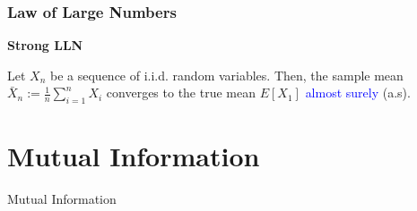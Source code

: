 \documentclass[
	10pt, %
]{beamer}
\def\tcb{\textcolor{blue}}
\begin{document}
\begin{frame}
    \frametitle{Law of Large Numbers}
\textbf{Strong LLN}
    \begin{definition}
    Let $X_n$ be a sequence of i.i.d. random variables. Then, the sample mean  $\bar{X}_n:=\frac{1}{n} \sum_{i=1}^n X_i$ converges to the true mean $E[X_1]$ \tcb{almost surely} (a.s).

    \end{definition}

 
\end{frame}

\section{Mutual Information}
\begin{frame}
	Mutual Information
\end{frame}
\end{document}
